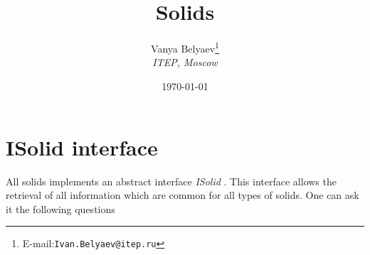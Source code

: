 	
\title{ Solids } 
\author{Vanya Belyaev\footnote{E-mail:{\tt Ivan.Belyaev@itep.ru} } \\ {\it ITEP, Moscow}}
\date{ \today }	

 
\maketitle 	

\tableofcontents 
	 
  \section{ ISolid interface } 
  All solids  implements an abstract interface  {\it ISolid }. 
This interface allows the retrieval of all information which 
are common for all types of solids.  
One can ask it the following questions
